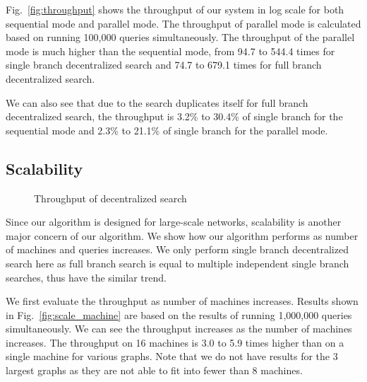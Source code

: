 Fig.~\ref{fig:throughput} shows the throughput of our system in log scale for both sequential mode and parallel mode. The throughput of parallel mode is calculated based on running 100,000 queries simultaneously. The throughput of the parallel mode is much higher than the sequential mode, from 94.7 to 544.4 times for single branch decentralized search and 74.7 to 679.1 times for full branch decentralized search. 

We can also see that due to the search duplicates itself for full branch decentralized search, the throughput is 3.2\% to 30.4\% of single branch for the sequential mode and 2.3\% to 21.1\% of single branch for the parallel mode. 

\subsection{Scalability}
\label{eval_scalability}

\begin{figure}[ht]
		\vspace{-0.2cm}
    \centering
    \caption{Throughput of decentralized search}
\end{figure}

Since our algorithm is designed for large-scale networks, scalability is another major concern of our algorithm. We show how our algorithm performs as number of machines and queries increases. We only perform single branch decentralized search here as full branch search is equal to multiple independent single branch searches, thus have the similar trend.

We first evaluate the throughput as number of machines increases. Results shown in Fig.~\ref{fig:scale_machine} are based on the results of running 1,000,000 queries simultaneously. We can see the throughput increases as the number of machines increases. The throughput on 16 machines is 3.0 to 5.9 times higher than on a single machine for various graphs. Note that we do not have results for the 3 largest graphs as they are not able to fit into fewer than 8 machines.

